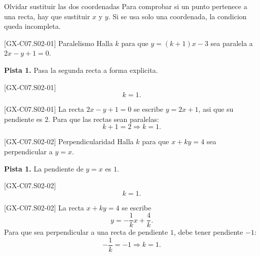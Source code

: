 \begin{commonerror}{Olvidar sustituir las dos coordenadas}
Para comprobar si un punto pertenece a una recta, hay que sustituir \(x\) y \(y\). Si se usa
solo una coordenada, la condicion queda incompleta.
\end{commonerror}

\begin{guidedexercise}{[GX-C07.S02-01] Paralelismo}
Halla \(k\) para que \(y=(k+1)x-3\) sea paralela a \(2x-y+1=0\).

\textbf{Pista 1.} Pasa la segunda recta a forma explicita.
\end{guidedexercise}

\begin{shortanswer}{[GX-C07.S02-01]}
\[
k=1.
\]
\end{shortanswer}

\begin{fullsolution}{[GX-C07.S02-01]}
La recta \(2x-y+1=0\) se escribe \(y=2x+1\), asi que su pendiente es \(2\). Para que las
rectas sean paralelas:
\[
k+1=2 \Longrightarrow k=1.
\]
\end{fullsolution}

\begin{guidedexercise}{[GX-C07.S02-02] Perpendicularidad}
Halla \(k\) para que \(x+ky=4\) sea perpendicular a \(y=x\).

\textbf{Pista 1.} La pendiente de \(y=x\) es \(1\).
\end{guidedexercise}

\begin{shortanswer}{[GX-C07.S02-02]}
\[
k=1.
\]
\end{shortanswer}

\begin{fullsolution}{[GX-C07.S02-02]}
La recta \(x+ky=4\) se escribe
\[
y=-\frac{1}{k}x+\frac{4}{k}.
\]
Para que sea perpendicular a una recta de pendiente \(1\), debe tener pendiente \(-1\):
\[
-\frac{1}{k}=-1 \Longrightarrow k=1.
\]
\end{fullsolution}

